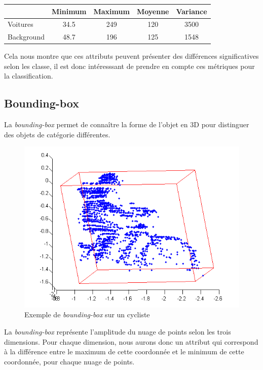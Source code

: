 		\begin{center}
			\begin{tabular}{|l||c|c|c|c|}
			  \hline
			  & Minimum & Maximum & Moyenne & Variance \\
			  \hline
			  Voitures & 34.5 & 249 & 120 & 3500 \\
			  Background & 48.7 & 196 & 125 & 1548 \\
			  \hline
			\end{tabular}
		\end{center}


		Cela nous montre que ces attributs peuvent présenter des différences significatives selon les classe, il est donc intéresssant de prendre en compte ces métriques pour la classification.

	\subsection{Bounding-box}
		La \emph{bounding-box} permet de connaître la forme de l'objet en 3D pour distinguer des objets de catégorie différentes.

		\begin{figure}[H]
			\centering
			\includegraphics[scale=0.6]{images/bounding_box_cyclist_2.png}
			\caption{Exemple de \emph{bounding-box} sur un cycliste}
			\label{fig:image}
		\end{figure}

		La \emph{bounding-box} représente l'amplitude du nuage de points selon les trois dimensions. Pour chaque dimension, nous aurons donc un attribut qui correspond à la différence entre le maximum de cette coordonnée et le minimum de cette coordonnée, pour chaque nuage de points.\\

